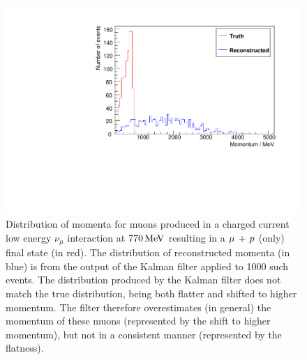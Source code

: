 \begin{figure}
\centering
\includegraphics[angle=-90,width=\textwidth]{chapters/trackfitting_images/kalman-ccqe-low}
\caption[True and reconstructed muon momentum distributions at $770\MeV$]{\label{fig:kalman-ccqe-low}Distribution of momenta for muons produced in a charged current low energy $\nu_\mu$ interaction at $770\MeV$ resulting in a $\mu\,+\,p$ (only) final state (in red). The distribution of reconstructed momenta (in blue) is from the output of the Kalman filter applied to 1000 such events. The distribution produced by the Kalman filter does not match the true distribution, being both flatter and shifted to higher momentum. The filter therefore overestimates (in general) the momentum of these muons (represented by the shift to higher momentum), but not in a consistent manner (represented by the flatness).}
\end{figure}

